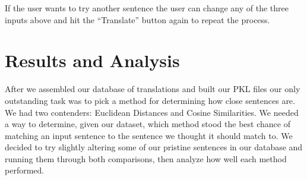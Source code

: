 \documentclass[runningheads]{llncs}
\begin{document}
	\begin{minipage}{\linewidth}
		\begin{center}
  			 \noindent{}
			\label{fig:Display Translations}
			\vspace*{1cm}
		\end{center}
	\end{minipage}

If the user wants to try another sentence the user can change any of the three inputs above and hit the ``Translate'' button again to repeat the process.

	\section{Results and Analysis}
	After we assembled our database of translations and built our PKL files our only outstanding task was to pick a method for determining how close sentences are. We had two contenders: Euclidean Distances and Cosine Similarities. We needed a way to determine, given our dataset, which method stood the best chance of matching an input sentence to the sentence we thought it should match to. We decided to try slightly altering some of our pristine sentences in our database and running them through both comparisons, then analyze how well each method performed.
\end{document}
